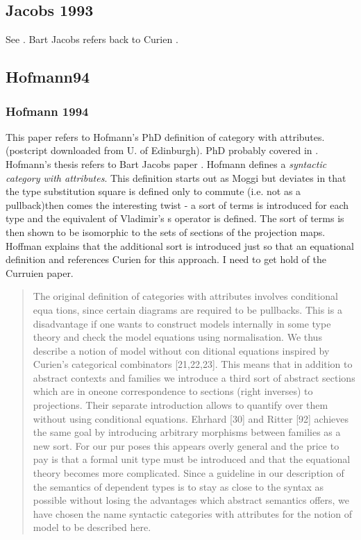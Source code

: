 \documentclass[14pt,a4paper]{scrartcl}
\begin{document}
\subsection{Jacobs 1993}
See \cite{jacobs93}.
Bart Jacobs refers back to Curien \cite{curien89}.

\subsection {Hofmann94}
\subsubsection{Hofmann 1994}
This paper refers to Hofmann's PhD definition of category with attributes.
(postcript downloaded from U. of Edinburgh). PhD probably covered in \cite{hofmann94}.
Hofmann's thesis refers to Bart Jacobs paper \cite{jacobs93}.
\noindent
Hofmann defines a \textit{syntactic category with attributes}.
This definition starts out as Moggi but deviates in that the  type substitution square is defined only to commute (i.e. not as a pullback)then comes the interesting twist - 
a sort of terms is introduced for each type and  the equivalent of Vladimir's s operator is defined. The sort of terms is then shown to be isomorphic 
to the sets of sections of the projection maps. Hoffman explains that
the additional sort is introduced just so that an equational definition and references Curien for this approach. I need to get hold of the Curruien paper.
\begin{quote}
The original definition of categories with attributes involves conditional equa­ 
tions, since certain diagrams are required to be pullbacks. This is a disadvantage if 
one wants to construct models internally in some type theory and check the model 
equations using normalisation. We thus describe a notion of model without con­ 
ditional equations inspired by Curien's categorical combinators [21,22,23]. This 
means that in addition to abstract contexts and families we introduce a third sort 
of abstract sections which are in one­one correspondence to sections (right inverses) 
to projections. Their separate introduction allows to quantify over them without 
using conditional equations. Ehrhard [30] and Ritter [92] achieves the same goal 
by introducing arbitrary morphisms between families as a new sort. For our pur­ 
poses this appears overly general and the price to pay is that a formal unit type 
must be introduced and that the equational theory becomes more complicated. 
Since a guideline in our description of the semantics of dependent types is to 
stay as close to the syntax as possible without losing the advantages which abstract 
semantics offers, we have chosen the name syntactic categories with attributes for 
the notion of model to be described here. 
\end{quote}
\end{document}
